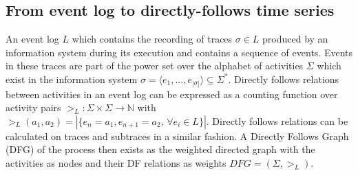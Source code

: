 \subsection{From event log to directly-follows time series}\label{sec:3a:preliminaries}

An event log $L$ which contains the recording of traces $\sigma \in L$ produced by an information system during its execution and contains a sequence of events.
Events in these traces are part of the power set over the alphabet of activities $\Sigma$ which exist in the information system $\sigma=\langle e_1,...,e_{|\sigma|}\rangle \subseteq \Sigma^*$.
Directly follows relations between activities in an event log can be expressed as a counting function over activity pairs $>_L: \Sigma\times\Sigma \to \mathbb{N}$ with $>_L(a_1,a_2) = |\{e_n=a_1,e_{n+1}=a_2, \,\forall e_i\in L\}|$.
Directly follows relations can be calculated on traces and subtraces in a similar fashion.
A Directly Follows Graph (DFG) of the process then exists as the weighted directed graph with the activities as nodes and their DF relations as weights $DFG=(\Sigma,>_L)$.

